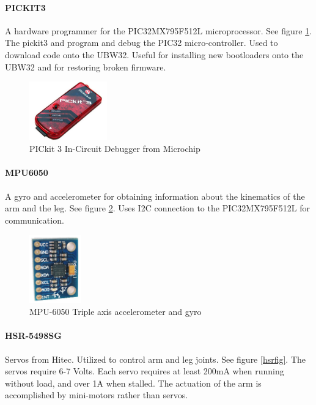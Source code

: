 \documentclass[titlepage,letterpaper,12pt]{article}
\begin{document}
\paragraph{PICKIT3}A hardware programmer for the PIC32MX795F512L
microprocessor. See figure \ref{pickit3fig}. The pickit3 and program and debug
the PIC32 micro-controller.  Used to download code onto the UBW32. Useful for
installing new bootloaders onto the UBW32 and for restoring broken
firmware\cite{pickitdata}.

\begin{figure}
  \centering
    \includegraphics[width=0.3\textwidth]{figures/pickit3.jpg}
  \caption{PICkit 3 In-Circuit Debugger from Microchip\protect\cite{pickitfigcite}}
  \label{pickit3fig}
\end{figure}

\paragraph{MPU6050}A gyro and accelerometer for obtaining information about the
kinematics of the arm and the leg. See figure \ref{mpufig}. Uses I2C connection
to the PIC32MX795F512L for communication\cite{mpu6050data}.

\begin{figure}
  \centering
    \includegraphics[width=0.2\textwidth]{figures/mpu-6050.jpg}
  \caption{MPU-6050 Triple axis accelerometer and gyro\protect\cite{Krodal2013}}
  \label{mpufig}
\end{figure}

\paragraph{HSR-5498SG}Servos from Hitec. Utilized to control arm and leg
joints. See figure \ref{hsrfig}. The servos require 6-7 Volts. Each servo
requires at least 200mA when running without load, and over 1A when stalled.
The actuation of the arm is accomplished by mini-motors rather than
servos\cite{sscdata}.
\end{document}
